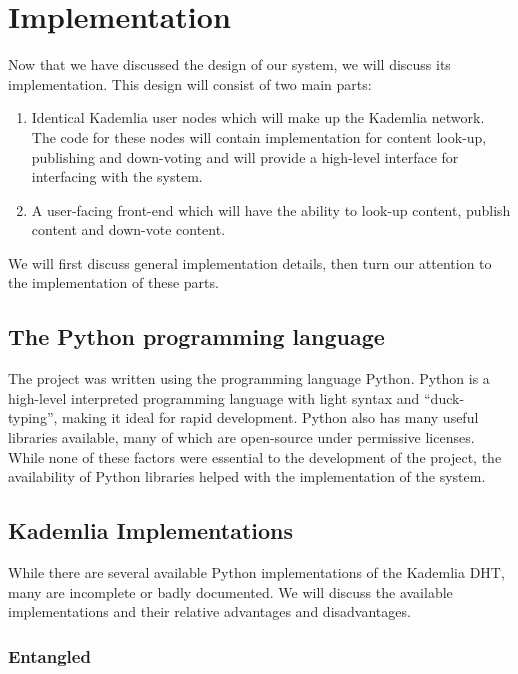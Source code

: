 \chapter{Implementation}

Now that we have discussed the design of our system, we will discuss its implementation.
This design will consist of two main parts:

\begin{enumerate}
	\item{Identical Kademlia user nodes which will make up the Kademlia network.
	The code for these nodes will contain implementation for content look-up, publishing and down-voting and will provide 
	a high-level interface for interfacing with the system. }
	\item A user-facing front-end which will have the ability to look-up content, publish content and down-vote content.
\end{enumerate}

We will first discuss general implementation details, then turn our attention to the implementation of these parts.

\section{The Python programming language}

The project was written using the programming language Python. Python is a high-level interpreted programming language with
light syntax and ``duck-typing'', making it ideal for rapid development. Python also has many useful libraries available,
many of which are open-source under permissive licenses. While none of these factors were essential to the development
of the project, the availability of Python libraries helped with the implementation of the system.

\section{Kademlia Implementations}

While there are several available Python implementations of the Kademlia DHT, many are incomplete or badly documented.
We will discuss the available implementations and their relative advantages and disadvantages.

\subsection{Entangled}

